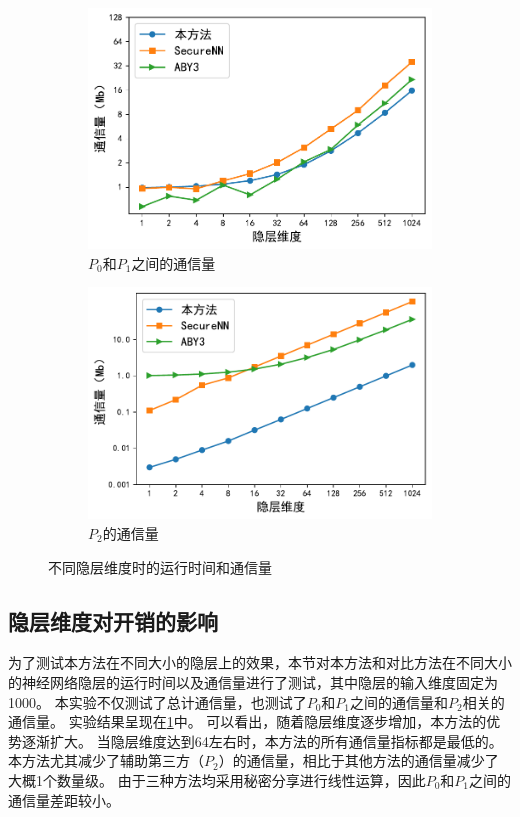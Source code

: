 \begin{figure}[h!]
    \begin{subfigure}[b]{0.48\linewidth}
    \centering
    \includegraphics[width=\linewidth]{Z_Resources/ss-perm_one-layer-c01.pdf}
    \caption{$P_0$和$P_1$之间的通信量}
    \end{subfigure}
    \begin{subfigure}[b]{0.48\linewidth}
    \centering
    \includegraphics[width=\linewidth]{Z_Resources/ss-perm_one-layer-c2.pdf}
    \caption{$P_2$的通信量}
    \end{subfigure}
\caption{不同隐层维度时的运行时间和通信量}
\label{fig:ss-perm:layer-dim}
\end{figure}

\subsection{隐层维度对开销的影响}
为了测试本方法在不同大小的隐层上的效果，本节对本方法和对比方法在不同大小的神经网络隐层的运行时间以及通信量进行了测试，其中隐层的输入维度固定为1000。
%
本实验不仅测试了总计通信量，也测试了$P_0$和$P_1$之间的通信量和$P_2$相关的通信量。
%
实验结果呈现在\ref{fig:ss-perm:layer-dim}中。
%
可以看出，随着隐层维度逐步增加，本方法的优势逐渐扩大。
当隐层维度达到64左右时，本方法的所有通信量指标都是最低的。
%
本方法尤其减少了辅助第三方（$P_2$）的通信量，相比于其他方法的通信量减少了大概1个数量级。
由于三种方法均采用秘密分享进行线性运算，因此$P_0$和$P_1$之间的通信量差距较小。

